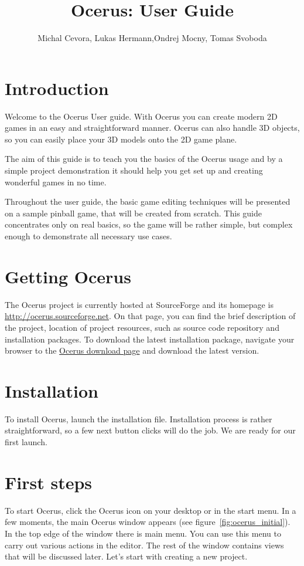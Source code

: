 \documentclass[a4paper,12pt]{article}
\title{Ocerus: User Guide}
\author{Michal Cevora, Lukas Hermann,Ondrej Mocny, Tomas Svoboda}
\date{}
\begin{document}
\maketitle

\tableofcontents

\section{Introduction}

Welcome to the Ocerus User guide. With Ocerus you can create modern 2D games in an easy and straightforward manner. Ocerus can also handle 3D objects, so you can easily place your 3D models onto the 2D game plane.

The aim of this guide is to teach you the basics of the Ocerus usage and by a simple project demonstration it should help you get set up and creating wonderful games in no time. 

Throughout the user guide, the basic game editing techniques will be presented on a sample pinball game, that will be created from scratch. This guide concentrates only on real basics, so the game will be rather simple, but complex enough to demonstrate all necessary use cases.

\section{Getting Ocerus}
The Ocerus project is currently hosted at SourceForge and its homepage is \url{http://ocerus.sourceforge.net}. On that page, you can find the brief description of the project, location of project resources, such as source code repository and installation packages. To download the latest installation package, navigate your browser to the \href{http://sourceforge.net/projects/ocerus/files/}{Ocerus download page} and download the latest version.

\section{Installation}
To install Ocerus, launch the installation file. Installation process is rather straightforward, so a few next button clicks will do the job. We are ready for our first launch.

\section{First steps}
To start Ocerus, click the Ocerus icon on your desktop or in the start menu. In a few moments, the main Ocerus window appears (see figure~\ref{fig:ocerus_initial}). In the top edge of the window there is main menu. You can use this menu to carry out various actions in the editor. The rest of the window contains views that will be discussed later. Let's start with creating a new project.
\end{document}
